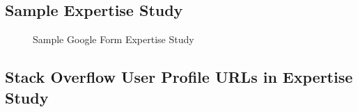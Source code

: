         \subsection{Sample Expertise Study}
            \begin{figure}
                \centerline{
                  \hfil
                   }
                \caption{Sample Google Form Expertise Study} \label{fig:sampleSurvey}
            \end{figure}
        
        \subsection{Stack Overflow User Profile URLs in Expertise Study}
        
